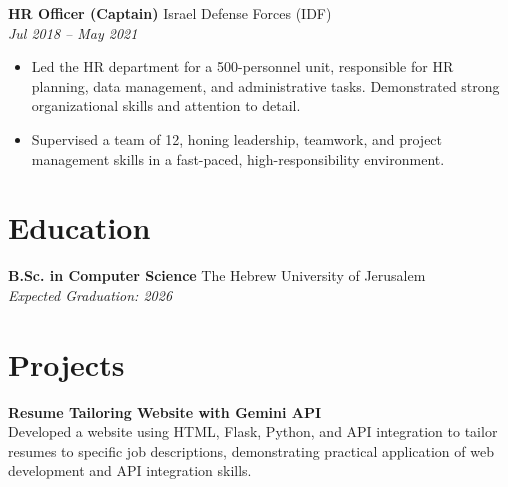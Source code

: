 \documentclass[a4paper,10pt]{article}
\begin{document}
\textbf{HR Officer (Captain)} \hfill Israel Defense Forces (IDF) \\
\textit{Jul 2018 -- May 2021}
\begin{itemize}[noitemsep,nolistsep]
    \item Led the HR department for a 500-personnel unit, responsible for HR planning, data management, and administrative tasks. Demonstrated strong organizational skills and attention to detail.
    \item Supervised a team of 12, honing leadership, teamwork, and project management skills in a fast-paced, high-responsibility environment.
\end{itemize}


\section*{Education}
\textbf{B.Sc. in Computer Science} \hfill The Hebrew University of Jerusalem \\
\textit{Expected Graduation: 2026} \\


\section*{Projects}
\textbf{Resume Tailoring Website with Gemini API} \\
Developed a website using HTML, Flask, Python, and API integration to tailor resumes to specific job descriptions, demonstrating practical application of web development and API integration skills.
\end{document}
